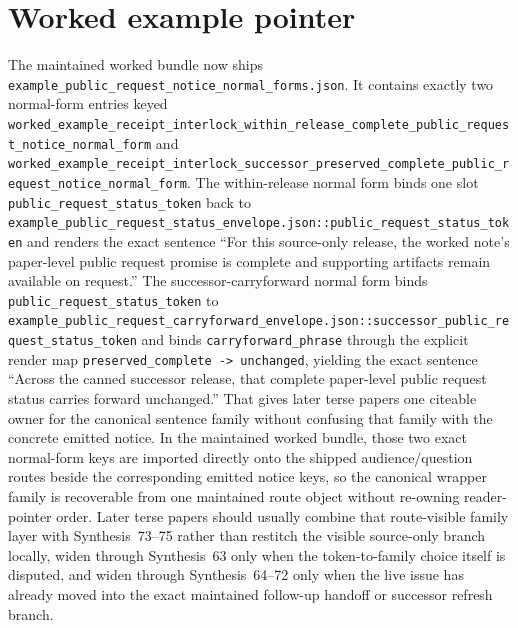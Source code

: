 \documentclass[11pt]{article}
\begin{document}
\section{Worked example pointer}
The maintained worked bundle now ships \nolinkurl{example_public_request_notice_normal_forms.json}.\cite{series:workedexample}
It contains exactly two normal-form entries keyed \nolinkurl{worked_example_receipt_interlock_within_release_complete_public_request_notice_normal_form} and \nolinkurl{worked_example_receipt_interlock_successor_preserved_complete_public_request_notice_normal_form}.
The within-release normal form binds one slot \nolinkurl{public_request_status_token} back to \nolinkurl{example_public_request_status_envelope.json::public_request_status_token} and renders the exact sentence ``For this source-only release, the worked note's paper-level public request promise is complete and supporting artifacts remain available on request.''
The successor-carryforward normal form binds \nolinkurl{public_request_status_token} to \nolinkurl{example_public_request_carryforward_envelope.json::successor_public_request_status_token} and binds \nolinkurl{carryforward_phrase} through the explicit render map \nolinkurl{preserved_complete -> unchanged}, yielding the exact sentence ``Across the canned successor release, that complete paper-level public request status carries forward unchanged.''
That gives later terse papers one citeable owner for the canonical sentence family without confusing that family with the concrete emitted notice. In the maintained worked bundle, those two exact normal-form keys are imported directly onto the shipped audience/question routes beside the corresponding emitted notice keys, so the canonical wrapper family is recoverable from one maintained route object without re-owning reader-pointer order. Later terse papers should usually combine that route-visible family layer with Synthesis~73--75 rather than restitch the visible source-only branch locally, widen through Synthesis~63 only when the token-to-family choice itself is disputed, and widen through Synthesis~64--72 only when the live issue has already moved into the exact maintained follow-up handoff or successor refresh branch.\cite{series:publicrequestnoticeselections,series:publicrequestresponsemenus,series:publicrequestresponsepackets,series:publicrequestresponsepacketcarryforward,series:publicrequestresponsepacketdeltaledgers,series:publicrequestresponsepacketrefreshnotices,series:publicrequestresponsepacketrefreshnoticenormalforms,series:publicrequestresponsepacketrefreshnoticeselections,series:publicrequestresponsepacketrefreshresponsemenus,series:publicrequestresponsepacketrefreshresponsepackets,series:publicrequestresponsepacketrefreshresponsepacketclosureverdicts,series:pairedterminalcitationdiscipline,series:pairedterminalcutoverrule}
\end{document}
